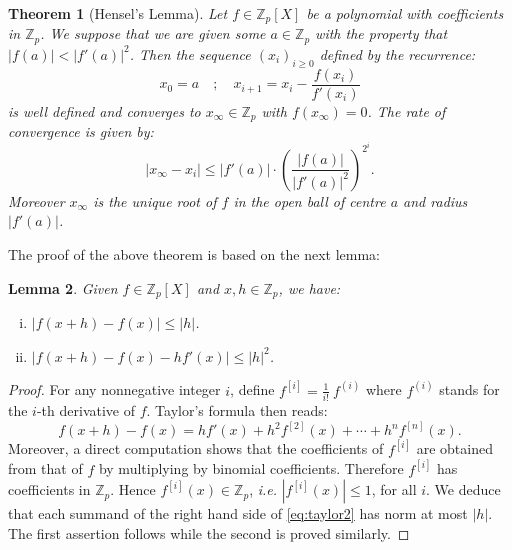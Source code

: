 \documentclass[11pt]{article}
\numberwithin{equation}{section}
\numberwithin{figure}{section}
\renewcommand{\leq}{\leqslant}
\renewcommand{\geq}{\geqslant}
\newtheorem{theo}{Theorem}[section]
\newtheorem{lem}[theo]{Lemma}
\theoremstyle{definition}
\newcommand{\Z}{\mathbb Z}
\newcommand{\Zp}{\Z_p}
\begin{document}
\begin{theo}[Hensel's Lemma]
\label{th:Hensel}
Let $f \in \Zp[X]$ be a polynomial with coefficients in $\Zp$.
We suppose that we are given some $a \in \Zp$ with the property that
$|f(a)| < |f'(a)|^2$. 
Then the sequence $(x_i)_{i \geq 0}$
defined by the recurrence:
$$x_0 = a \quad ; \quad x_{i+1} = x_i - \frac{f(x_i)}{f'(x_i)}$$
is well defined and converges to $x_\infty \in \Zp$ with $f(x_\infty) = 
0$.
The rate of convergence is given by:
$$|x_\infty - x_i| \leq |f'(a)| \cdot 
\left(\frac{|f(a)|}{|f'(a)|^2}\right)^{2^i}.$$
Moreover $x_\infty$ is the unique root of $f$ in the open ball of
centre $a$ and radius $|f'(a)|$.
\end{theo}

The proof of the above theorem is based on the next lemma:

\begin{lem}
\label{lem:polyC2}
Given $f \in \Zp[X]$ and $x, h \in \Zp$, we have:
\begin{enumerate}[(i)]
\item $|f(x+h) - f(x)| \leq |h|$.
\item $|f(x+h) - f(x) - h f'(x)| \leq |h|^2$.
\end{enumerate}
\end{lem}

\begin{proof}
For any nonnegative integer $i$, define $f^{[i]} = \frac 1{i!} \: 
f^{(i)}$ where $f^{(i)}$ stands for the $i$-th derivative of $f$.
Taylor's formula then reads:
\begin{equation}
\label{eq:taylor2}
f(x+h) - f(x) = h f'(x) + h^2 f^{[2]}(x) + \cdots + h^n f^{[n]}(x).
\end{equation}
Moreover, a direct computation shows that the coefficients of $f^{[i]}$ 
are obtained from that of $f$ by multiplying by binomial coefficients. 
Therefore $f^{[i]}$ has coefficients in $\Zp$. Hence $f^{[i]}(x) \in 
\Zp$, \emph{i.e.} $|f^{[i]}(x)| \leq 1$, for all $i$.
We deduce that each summand of the right hand
side of \eqref{eq:taylor2} has norm at most $|h|$. The first assertion
follows while the second is proved similarly.
\end{proof}
\end{document}

